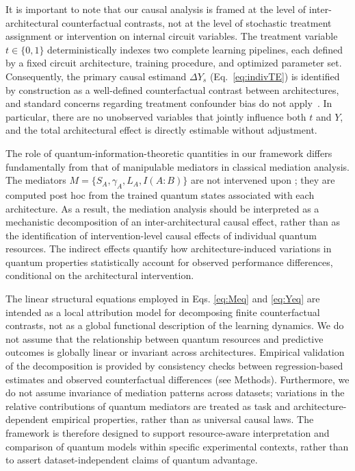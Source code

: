 \documentclass[
    reprint,
    amsmath, amssymb,
    aps,
    floatfix,
    nofootinbib
]{revtex4-1}
\begin{document}
It is important to note that our causal analysis is framed at the level of inter-architectural counterfactual contrasts, not at the level of stochastic treatment assignment or intervention on internal circuit variables. The treatment variable $t \in \{0,1\}$ deterministically indexes two complete learning pipelines, each defined by a fixed circuit architecture, training procedure, and optimized parameter set. Consequently, the primary causal estimand $\Delta Y_s$ (Eq.~\ref{eq:indivTE}) is identified by construction as a well-defined counterfactual contrast between architectures, and standard concerns regarding treatment confounder bias do not apply~\cite{rubin1974estimating}. In particular, there are no unobserved variables that jointly influence both $t$ and $Y$, and the total architectural effect is directly estimable without adjustment.

The role of quantum-information-theoretic quantities in our framework differs fundamentally from that of manipulable mediators in classical mediation analysis. The mediators $M = \{S_A, \gamma_A, L_A, I(A:B)\}$ are not intervened upon \cite{imai2010general}; they are computed post hoc from the trained quantum states associated with each architecture. As a result, the mediation analysis should be interpreted as a mechanistic decomposition of an inter-architectural causal effect, rather than as the identification of intervention-level causal effects of individual quantum resources. The indirect effects quantify how architecture-induced variations in quantum properties statistically account for observed performance differences, conditional on the architectural intervention.

The linear structural equations employed in Eqs. \ref{eq:Meq} and \ref{eq:Yeq} are intended as a local attribution model for decomposing finite counterfactual contrasts, not as a global functional description of the learning dynamics. We do not assume that the relationship between quantum resources and predictive outcomes is globally linear or invariant across architectures. Empirical validation of the decomposition is provided by consistency checks between regression-based estimates and observed counterfactual differences (see Methods). Furthermore, we do not assume invariance of mediation patterns across datasets; variations in the relative contributions of quantum mediators are treated as task and architecture-dependent empirical properties, rather than as universal causal laws. The framework is therefore designed to support resource-aware interpretation and comparison of quantum models within specific experimental contexts, rather than to assert dataset-independent claims of quantum advantage.
\end{document}
